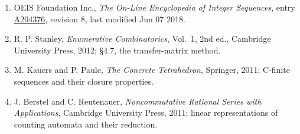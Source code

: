 \documentclass[11pt]{article}
\theoremstyle{definition}
\begin{document}
\begin{enumerate}

\item OEIS Foundation Inc., \emph{The On-Line Encyclopedia of Integer Sequences}, entry \href{https://oeis.org/A204376}{A204376}, revision 8, last modified Jun 07 2018.

\item R. P. Stanley, \emph{Enumerative Combinatorics}, Vol.~1, 2nd ed., Cambridge University Press, 2012; \S4.7, the transfer-matrix method.

\item M. Kauers and P. Paule, \emph{The Concrete Tetrahedron}, Springer, 2011; C-finite sequences and their closure properties.

\item J. Berstel and C. Reutenauer, \emph{Noncommutative Rational Series with Applications}, Cambridge University Press, 2011; linear representations of counting automata and their reduction.

\end{enumerate}
\end{document}
